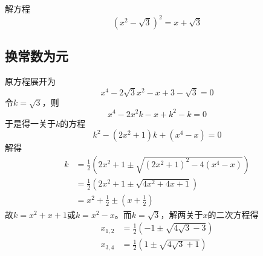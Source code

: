 

解方程
\[ \left(x^2 - \sqrt3\right)^2 = x + \sqrt3 \]


\subsection{换常数为元}

原方程展开为
\[ x^4 - 2\sqrt3x^2 - x + 3 - \sqrt3 = 0 \]
令$k = \sqrt3$，则
\[ x^4 - 2x^2k - x + k^2 - k = 0 \]
于是得一关于$k$的方程
\[ k^2 - \left(2x^2 + 1\right)k + \left(x^4 - x\right) = 0 \]
解得
\begin{align*}
  k &= \frac12\left(2x^2 + 1 \pm \sqrt{\left(2x^2 + 1\right)^2 - 4\left(x^4 - x\right)}\right) \\
  &= \frac12\left(2x^2 + 1 \pm \sqrt{4x^2 + 4x + 1}\right) \\
  &= x^2 + \frac12 \pm \left(x + \frac12\right)
\end{align*}
故$k = x^2 + x + 1$或$k = x^2 - x$。而$k = \sqrt3$，解两关于$x$的二次方程得
\begin{align*}
  x_{1,2} &= \frac12\left(-1 \pm \sqrt{4\sqrt3 - 3}\right) \\
  x_{3,4} &= \frac12\left(1 \pm \sqrt{4\sqrt3 + 1}\right)
\end{align*}